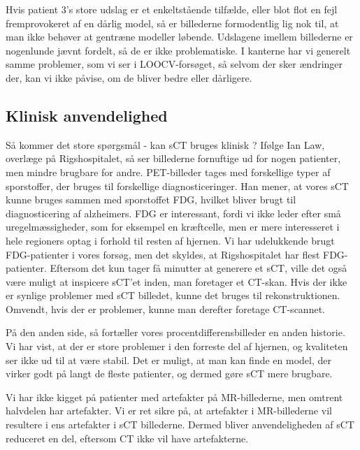 Hvis patient 3’s store udslag er et enkeltstående tilfælde, eller
blot flot en fejl fremprovokeret af en dårlig model, så er billederne
formodentlig lig nok til, at man ikke behøver at gentræne modeller
løbende. Udslagene imellem billederne er nogenlunde jævnt fordelt, så
de er ikke problematiske. I kanterne har vi generelt samme problemer,
som vi ser i LOOCV-forsøget, så selvom der sker ændringer der, kan vi
ikke påvise, om de bliver bedre eller dårligere.

\subsection{Klinisk anvendelighed}

Så kommer det store spørgsmål - kan sCT bruges klinisk ?  Ifølge Ian Law, overlæge på Rigshospitalet, så ser billederne fornuftige ud for nogen patienter, men mindre brugbare for andre. PET-billeder tages med forskellige typer af sporstoffer, der bruges til forskellige diagnosticeringer. Han mener, at vores sCT kunne bruges sammen med sporstoffet FDG, hvilket bliver brugt til diagnosticering af alzheimers. FDG er interessant, fordi vi ikke leder efter små uregelmæssigheder, som for eksempel en kræftcelle, men er mere interesseret i hele regioners optag i forhold til resten af hjernen. Vi har udelukkende brugt FDG-patienter i vores forsøg, men det skyldes, at Rigshospitalet har flest FDG-patienter. Eftersom det kun tager få minutter at generere et sCT, ville det også være muligt at inspicere sCT’et inden, man foretager et CT-skan. Hvis der ikke er synlige problemer med sCT billedet, kunne det bruges til rekonstruktionen. Omvendt, hvis der er problemer, kunne man derefter foretage CT-scannet.

På den anden side, så fortæller vores procentdifferensbilleder en anden historie. Vi har vist, at der er store problemer i den forreste del af hjernen, og kvaliteten ser ikke ud til at være stabil. Det er muligt, at man kan finde en model, der virker godt på langt de fleste patienter, og dermed gøre sCT mere brugbare.

Vi har ikke kigget på patienter med artefakter på MR-billederne, men omtrent halvdelen har artefakter. Vi er ret sikre på, at artefakter i MR-billederne vil resultere i ens artefakter i sCT billederne. Dermed bliver anvendeligheden af sCT reduceret en del, eftersom CT ikke vil have artefakterne.
